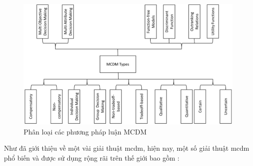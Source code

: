 \begin{figure}[H]
    \centering
    \includegraphics[width=0.8\linewidth, height=0.35\textheight]{images/MCDMtype.png}
    \vspace{0.6cm}
    \caption{Phân loại các phương pháp luận MCDM}
\end{figure}

Như đã giới thiệu về một vài giải thuật \acrshort{mcdm}, hiện nay, một số giải thuật \acrshort{mcdm} phổ biến và được sử dụng rộng rãi trên thế giới bao gồm \cite{sciencedirect1}: 

